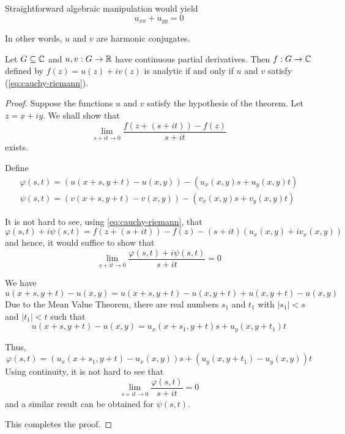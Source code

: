 Straightforward algebraic manipulation would yield 
\begin{equation*}
    u_{xx} + u_{yy} = 0
\end{equation*}

In other words, $u$ and $v$ are harmonic conjugates.

\begin{theorem}
    Let $G\subseteq\mathbb{C}$ and $u,v: G\to\mathbb{R}$ have continuous partial derivatives. Then $f: G\to\mathbb{C}$ defined by $f(z) = u(z) + iv(z)$ is analytic if and only if $u$ and $v$ satisfy (\ref{eq:cauchy-riemann}).
\end{theorem}
\begin{proof}
    Suppose the functions $u$ and $v$ satisfy the hypothesis of the theorem. Let $z = x + iy$. We shall show that 
    \begin{equation*}
        \lim_{s + it\to 0}\frac{f(z + (s + it)) - f(z)}{s + it}
    \end{equation*}
    exists.

    Define 
    \begin{align*}
        \varphi(s,t) = \left(u(x + s, y + t) - u(x,y)\right) - \left(u_x(x,y)s + u_y(x,y)t\right)\\
        \psi(s,t) = \left(v(x + s, y + t) - v(x,y)\right) - \left(v_x(x,y)s + v_y(x,y)t\right)
    \end{align*}

    It is not hard to see, using \ref{eq:cauchy-riemann}, that 
    \begin{equation*}
        \varphi(s,t) + i\psi(s,t) = f(z + (s + it)) - f(z) - (s + it)(u_x(x,y) + iv_x(x,y))
    \end{equation*}
    and hence, it would suffice to show that 
    \begin{equation*}
        \lim_{s + it\to 0}\frac{\varphi(s,t) + i\psi(s,t)}{s + it} = 0
    \end{equation*}

    We have 
    \begin{equation*}
        u(x + s, y + t) - u(x,y) = u(x + s, y + t) - u(x, y + t) + u(x, y + t) - u(x,y)
    \end{equation*}
    Due to the Mean Value Theorem, there are real numbers $s_1$ and $t_1$ with $|s_1| < s$ and $|t_1| < t$ such that 
    \begin{equation*}
        u(x + s, y + t) - u(x,y) = u_x(x + s_1, y + t)s + u_y(x, y + t_1)t
    \end{equation*}

    Thus, 
    \begin{equation*}
        \varphi(s,t) = (u_x(x + s_1, y + t) - u_x(x,y))s + (u_y(x, y + t_1) - u_y(x,y))t
    \end{equation*}
    Using continuity, it is not hard to see that 
    \begin{equation*}
        \lim_{s + it\to 0}\frac{\varphi(s,t)}{s + it} = 0
    \end{equation*}
    and a similar result can be obtained for $\psi(s, t)$.

    This completes the proof.
\end{proof}

